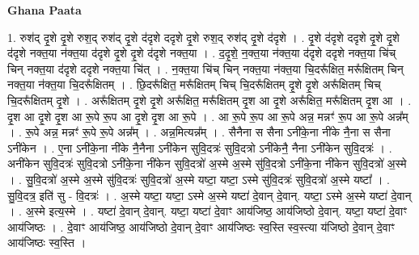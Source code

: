 \documentclass[17pt]{extarticle}
\begin{document}
\textbf{Ghana Paata } \newline

1. रुश॑द् दृ॒शे दृ॒शे रुश॒द् रुश॑द् दृ॒शे द॑दृशे ददृशे दृ॒शे रुश॒द् रुश॑द् दृ॒शे द॑दृशे । . दृ॒शे द॑दृशे ददृशे दृ॒शे दृ॒शे द॑दृशे नक्त॒या न॑क्त॒या द॑दृशे दृ॒शे दृ॒शे द॑दृशे नक्त॒या । . द॒दृ॒शे॒ न॒क्त॒या न॑क्त॒या द॑दृशे ददृशे नक्त॒या चि॑च् चिन् नक्त॒या द॑दृशे ददृशे नक्त॒या चि॑त् । . न॒क्त॒या चि॑च् चिन् नक्त॒या न॑क्त॒या चि॒दरू᳚क्षित॒ मरू᳚क्षितम् चिन् नक्त॒या न॑क्त॒या चि॒दरू᳚क्षितम् । . छि॒दरू᳚क्षित॒ मरू᳚क्षितम् चिच् चि॒दरू᳚क्षितम् दृ॒शे दृ॒शे अरू᳚क्षितम् चिच् चि॒दरू᳚क्षितम् दृ॒शे । . अरू᳚क्षितम् दृ॒शे दृ॒शे अरू᳚क्षित॒ मरू᳚क्षितम् दृ॒श आ दृ॒शे अरू᳚क्षित॒ मरू᳚क्षितम् दृ॒श आ । . दृ॒श आ दृ॒शे दृ॒श आ रू॒पे रू॒प आ दृ॒शे दृ॒श आ रू॒पे । . आ रू॒पे रू॒प आ रू॒पे अन्न॒ मन्नꣳ॑ रू॒प आ रू॒पे अन्न᳚म् । . रू॒पे अन्न॒ मन्नꣳ॑ रू॒पे रू॒पे अन्न᳚म् । . अन्न॒मित्यन्न᳚म् । . सैनैना स सैना ऽनी॑के॒ना नी॑के नै॒ना स सैना ऽनी॑केन । . ए॒ना ऽनी॑के॒ना नी॑के नै॒नैना ऽनी॑केन सुवि॒दत्रः॑ सुवि॒दत्रो ऽनी॑केनै॒ नैना ऽनी॑केन सुवि॒दत्रः॑ । . अनी॑केन सुवि॒दत्रः॑ सुवि॒दत्रो ऽनी॑के॒ना नी॑केन सुवि॒दत्रो॑ अ॒स्मे अ॒स्मे सु॑वि॒दत्रो ऽनी॑के॒ना नी॑केन सुवि॒दत्रो॑ अ॒स्मे । . सु॒वि॒दत्रो॑ अ॒स्मे अ॒स्मे सु॑वि॒दत्रः॑ सुवि॒दत्रो॑ अ॒स्मे यष्टा॒ यष्टा॒ ऽस्मे सु॑वि॒दत्रः॑ सुवि॒दत्रो॑ अ॒स्मे यष्टा᳚ । . सु॒वि॒दत्र॒ इति॑ सु - वि॒दत्रः॑ । . अ॒स्मे यष्टा॒ यष्टा॒ ऽस्मे अ॒स्मे यष्टा॑ दे॒वान् दे॒वान्. यष्टा॒ ऽस्मे अ॒स्मे यष्टा॑ दे॒वान् । . अ॒स्मे इत्य॒स्मे । . यष्टा॑ दे॒वान् दे॒वान्. यष्टा॒ यष्टा॑ दे॒वाꣳ आय॑जिष्ठ॒ आय॑जिष्ठो दे॒वान्. यष्टा॒ यष्टा॑ दे॒वाꣳ आय॑जिष्ठः । . दे॒वाꣳ आय॑जिष्ठ॒ आय॑जिष्ठो दे॒वान् दे॒वाꣳ आय॑जिष्ठः स्व॒स्ति स्व॒स्त्या य॑जिष्ठो दे॒वान् दे॒वाꣳ आय॑जिष्ठः स्व॒स्ति । \newline
\end{document}
